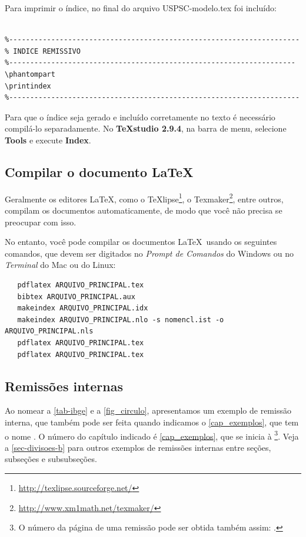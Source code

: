 Para imprimir o índice, no final do arquivo USPSC-modelo.tex foi incluído:

\begin{verbatim}

%---------------------------------------------------------------------
% INDICE REMISSIVO
%--------------------------------------------------------------------
\phantompart
\printindex
%---------------------------------------------------------------------
\end{verbatim}

Para que o índice seja gerado e incluído corretamente no texto é necessário compilá-lo separadamente. No \textbf{TeXstudio 2.9.4}, na barra de menu, selecione \textbf{Tools} e execute \textbf{Index}.


\subsection{Compilar o documento \LaTeX}

Geralmente os editores \LaTeX, como o
TeXlipse\footnote{\url{http://texlipse.sourceforge.net/}}, o
Texmaker\footnote{\url{http://www.xm1math.net/texmaker/}}, entre outros,
compilam os documentos automaticamente, de modo que você não precisa se
preocupar com isso.

No entanto, você pode compilar os documentos \LaTeX\ usando os seguintes
comandos, que devem ser digitados no \emph{Prompt de Comandos} do Windows ou no
\emph{Terminal} do Mac ou do Linux:

\begin{verbatim}
   pdflatex ARQUIVO_PRINCIPAL.tex
   bibtex ARQUIVO_PRINCIPAL.aux
   makeindex ARQUIVO_PRINCIPAL.idx 
   makeindex ARQUIVO_PRINCIPAL.nlo -s nomencl.ist -o ARQUIVO_PRINCIPAL.nls
   pdflatex ARQUIVO_PRINCIPAL.tex
   pdflatex ARQUIVO_PRINCIPAL.tex
\end{verbatim}

\subsection{Remissões internas}

Ao nomear a \autoref{tab-ibge} e a \autoref{fig_circulo}, apresentamos um exemplo de remissão interna, que também pode ser feita quando indicamos o
\autoref{cap_exemplos}, que tem o nome \emph{}. O número
do capítulo indicado é \ref{cap_exemplos}, que se inicia à
\footnote{O número da página de uma remissão pode ser
	obtida também assim:
	\pageref{cap_exemplos}.}.
Veja a \autoref{sec-divisoes-b} para outros exemplos de remissões internas entre
seções, subseções e subsubseções.

